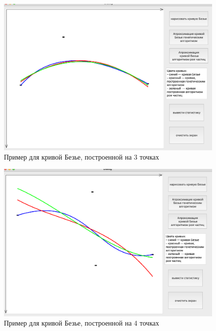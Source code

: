 \documentclass[12pt]{report}
\begin{document}
\begin{figure}[h!]
  \centering
  \includegraphics[width = \linewidth]{3.png}
  \caption{Пример для кривой Безье, построенной на 3 точках}
  \label{fig:points3}
\end{figure}
\newpage
\begin{figure}[h!]
  \centering
  \includegraphics[width = \linewidth]{4.png}
  \caption{Пример для кривой Безье, построенной на 4 точках}
  \label{fig:points4}
\end{figure}
\newpage
\end{document}
